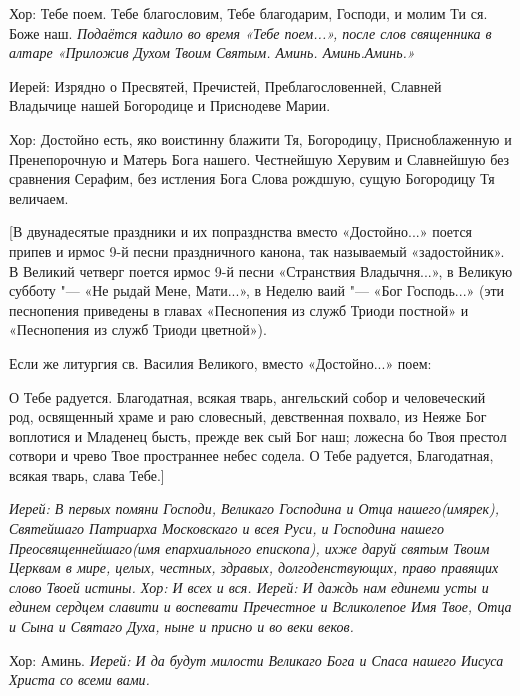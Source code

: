 Хор:\normalfont{} Тебе поем. Тебе благословим, Тебе благодарим, Господи, и молим Ти ся. Боже наш. \itshape  Подаётся кадило во время «Тебе поем...», после слов священника в алтаре «Приложив Духом Твоим Святым. Аминь. Аминь.Аминь.\normalfont{}»  \itshape 


  Иерей:\normalfont{} Изрядно о Пресвятей, Пречистей, Преблагословенней, Славней Владычице нашей Богородице и Приснодеве Марии. \itshape 


Хор:\normalfont{} Достойно есть, яко воистинну блажити Тя, Богородицу, Присноблаженную и Пренепорочную и Матерь Бога нашего. Честнейшую Херувим и Славнейшую без сравнения Серафим, без истления Бога Слова рождшую, сущую Богородицу Тя величаем. 


 [В двунадесятые праздники и их попразднства вместо «Достойно...» поется припев и ирмос 9-й песни праздничного канона, так называемый «задостойник». В Великий четверг поется ирмос 9-й песни «Странствия Владычня...», в Великую субботу "--- «Не рыдай Мене, Мати...», в Неделю ваий "--- «Бог Господь...» (эти песнопения приведены в главах «Песнопения из служб Триоди постной» и «Песнопения из служб Триоди цветной»).


 Если же литургия св. Василия Великого, вместо «Достойно...» поем: 


      О Тебе радуется. Благодатная, всякая тварь, ангельский собор и человеческий род, освященный храме и раю словесный, девственная похвало, из Неяже Бог воплотися и Младенец бысть, прежде век сый Бог наш; ложесна бо Твоя престол сотвори и чрево Твое пространнее небес содела. О Тебе радуется, Благодатная, всякая тварь, слава Тебе.]


\itshape  Иерей:\normalfont{} В первых помяни Господи, Великаго Господина и Отца нашего\itshape  (имярек),\normalfont{} Святейшаго Патриарха Московскаго и всея Руси, и Господина нашего Преосвященнейшаго\itshape  (имя епархиального епископ\normalfont{}а), ихже даруй святым Твоим Церквам в мире, целых, честных, здравых, долгоденствующих, право правящих слово Твоей истины. \itshape  Хор:\normalfont{} И всех и вся. \itshape  Иерей:\normalfont{} И даждь нам единеми усты и единем сердцем славити и воспевати Пречестно\itshape е\normalfont{} и Всликолепое Имя Твое, Отца и Сына и Святаго Духа, ныне и присно и во веки веков. \itshape 

 


  Хор:\normalfont{} Аминь. \itshape  Иерей:\normalfont{} И да будут милости Великаго Бога и Спаса нашего Иисуса Христа со всеми вами. \itshape 


